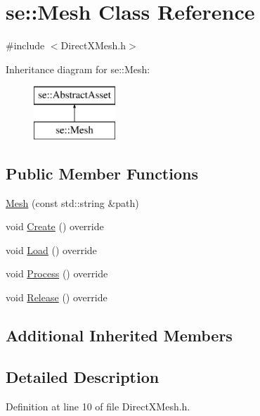 \hypertarget{classse_1_1_mesh}{}\section{se\+:\+:Mesh Class Reference}
\label{classse_1_1_mesh}


{\ttfamily \#include $<$Direct\+X\+Mesh.\+h$>$}

Inheritance diagram for se\+:\+:Mesh\+:\begin{figure}[H]
\begin{center}
\leavevmode
\includegraphics[height=2.000000cm]{classse_1_1_mesh}
\end{center}
\end{figure}
\subsection*{Public Member Functions}
\begin{DoxyCompactItemize}
\item 
\mbox{\hyperlink{classse_1_1_mesh_ae86eb85813a4f488bcd52a089f63ff0e}{Mesh}} (const std\+::string \&path)
\item 
void \mbox{\hyperlink{classse_1_1_mesh_a56e2d07f7b642c16e89631796a0d576e}{Create}} () override
\item 
void \mbox{\hyperlink{classse_1_1_mesh_a17116983a6c6e73770585b72332c5140}{Load}} () override
\item 
void \mbox{\hyperlink{classse_1_1_mesh_a1ae42a794ee240b5d6a0dd46aa4ea60d}{Process}} () override
\item 
void \mbox{\hyperlink{classse_1_1_mesh_afde4ccf6665a9b6c7a8f3635dd5139e0}{Release}} () override
\end{DoxyCompactItemize}
\subsection*{Additional Inherited Members}


\subsection{Detailed Description}


Definition at line 10 of file Direct\+X\+Mesh.\+h.



